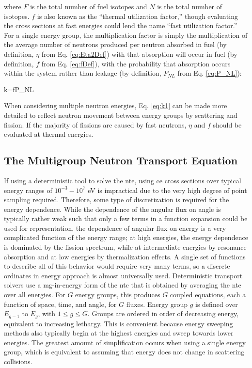  where \(F\) is the total number of fuel isotopes and \(N\) is the total number of isotopes. \(f\) is also known as the ``thermal utilization factor,'' though evaluating the cross sections at fast energies could lend the name ``fast utilization factor.'' For a single energy group, the multiplication factor is simply the multiplication of the average number of neutrons produced per neutron absorbed in fuel (by definition, \(\eta\) from Eq. \eqref{eq:Eta2Def}) with that absorption will occur in fuel (by definition, \(f\) from Eq. \eqref{eq:fDef}), with the probability that absorption occurs within the system rather than leakage (by definition, \(P_{NL}\) from Eq. \eqref{eq:P_NL}):
 
 \beq
 \label{eq:k1}
 k=\eta fP_{NL}
 \eeq
 
When considering multiple neutron energies, Eq. \eqref{eq:k1} can be made more detailed to reflect neutron movement between energy groups by scattering and fission. If the majority of fissions are caused by fast neutrons, \(\eta\) and \(f\) should be evaluated at thermal energies. 

\subsection{The Multigroup Neutron Transport Equation}
\label{sec:MGNTE}

If using a deterministic tool to solve the \gls{nte}, using \gls{ce} cross sections over typical energy ranges of \(10^{-3}-10^7\) eV is impractical due to the very high degree of point sampling required. Therefore, some type of discretization is required for the energy dependence. While the dependence of the angular flux on angle is typically rather weak such that only a few terms in a function expansion could be used for representation, the dependence of angular flux on energy is a very complicated function of the energy range; at high energies, the energy dependence is dominated by the fission spectrum, while at intermediate energies by resonance absorption and at low energies by thermalization effects. A single set of functions to describe all of this behavior would require very many terms, so a discrete ordinates in energy approach is almost universally used. Deterministic transport solvers use a \gls{mg}-in-energy form of the \gls{nte} that is obtained by averaging the \gls{nte} over all energies. For \(G\) energy groups, this produces \(G\) coupled equations, each a function of space, time, and angle, for \(G\) fluxes. Energy group \(g\) is defined over \(E_{g-1}\) to \(E_{g}\), with \(1\leq g\leq G\). Groups are ordered in order of decreasing energy, equivalent to increasing lethargy. This is convenient because energy sweeping methods also typically begin at the highest energies and sweep towards lower energies. The greatest amount of simplification occurs when using a single energy group, which is equivalent to assuming that energy does not change in scattering collisions.

